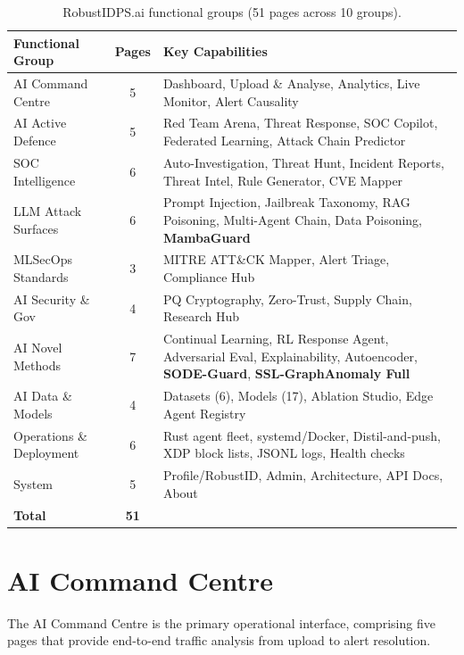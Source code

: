 \begin{table}[htbp]
\centering
\caption{RobustIDPS.ai functional groups (51 pages across 10 groups).}
\label{tab:functional_groups}
\small
\begin{tabular}{lcp{7.5cm}}
\toprule
\textbf{Functional Group} & \textbf{Pages} & \textbf{Key Capabilities} \\
\midrule
AI Command Centre      & 5 & Dashboard, Upload \& Analyse, Analytics, Live Monitor, Alert Causality \\
AI Active Defence      & 5 & Red Team Arena, Threat Response, SOC Copilot, Federated Learning, Attack Chain Predictor \\
SOC Intelligence       & 6 & Auto-Investigation, Threat Hunt, Incident Reports, Threat Intel, Rule Generator, CVE Mapper \\
LLM Attack Surfaces    & 6 & Prompt Injection, Jailbreak Taxonomy, RAG Poisoning, Multi-Agent Chain, Data Poisoning, \textbf{MambaGuard} \\
MLSecOps Standards     & 3 & MITRE ATT\&CK Mapper, Alert Triage, Compliance Hub \\
AI Security \& Gov     & 4 & PQ Cryptography, Zero-Trust, Supply Chain, Research Hub \\
AI Novel Methods       & 7 & Continual Learning, RL Response Agent, Adversarial Eval, Explainability, Autoencoder, \textbf{SODE-Guard}, \textbf{SSL-GraphAnomaly Full} \\
AI Data \& Models      & 4 & Datasets (6), Models (17), Ablation Studio, Edge Agent Registry \\
Operations \& Deployment & 6 & Rust agent fleet, systemd/Docker, Distil-and-push, XDP block lists, JSONL logs, Health checks \\
System                 & 5 & Profile/RobustID, Admin, Architecture, API Docs, About \\
\midrule
\textbf{Total}         & \textbf{51} & \\
\bottomrule
\end{tabular}
\end{table}


\section{AI Command Centre}
\label{sec:command_centre}

The AI Command Centre is the primary operational interface, comprising five pages that provide end-to-end traffic analysis from upload to alert resolution.

